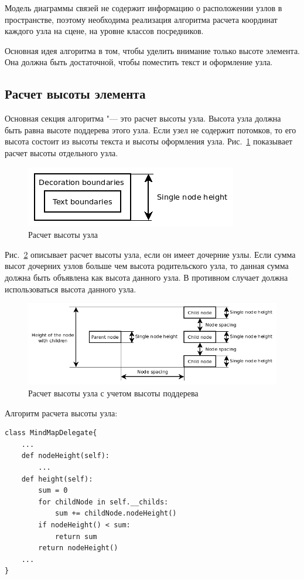 Модель диаграммы связей не содержит информацию о расположении узлов в пространстве, поэтому необходима реализация алгоритма расчета координат каждого узла на сцене, на уровне классов посредников.

Основная идея алгоритма в том, чтобы уделить внимание только высоте элемента. Она должна быть достаточной, чтобы поместить текст и оформление узла.

\subsection{Расчет высоты элемента}

Основная секция алгоритма "--- это расчет высоты узла. Высота узла должна быть равна высоте поддерева этого узла. Если узел не содержит потомков, то его высота состоит из высоты текста и высоты оформления узла. Рис.~\ref{ris:node_single} показывает расчет высоты отдельного узла.
\begin{figure}[h!]
\centering
\includegraphics[width=0.5\linewidth]{node-single}
\caption{Расчет высоты узла}
\label{ris:node_single}
\end{figure}

Рис.~\ref{ris:node_complex}  описывает расчет высоты узла, если он имеет дочерние узлы. Если сумма высот дочерних узлов больше чем высота родительского узла, то данная сумма должна быть объявлена как высота данного узла. В противном случает должна использоваться высота данного узла.

\begin{figure}[h!]
\centering
\includegraphics[width=\linewidth]{node-complex}
\caption{Расчет высоты узла с учетом высоты поддерева}
\label{ris:node_complex}
\end{figure}

Алгоритм расчета высоты узла:
\begin{lstlisting}
class MindMapDelegate{
	...
	def nodeHeight(self):
		...
	def height(self):
		sum = 0
		for childNode in self.__childs:
			sum += childNode.nodeHeight()
		if nodeHeight() < sum:
			return sum
		return nodeHeight()
	...
}
\end{lstlisting}

